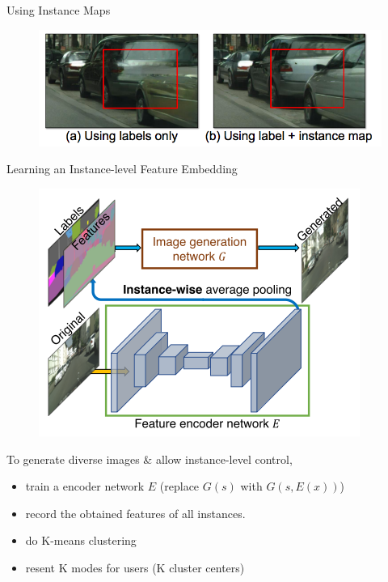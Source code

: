 \documentclass{beamer}
\begin{document}
\begin{frame}{Using Instance Maps}
\begin{figure}
	\centering
	\includegraphics[height=0.45\textheight]{images/instance_result}
\end{figure}
\end{frame}

\begin{frame}{Learning an Instance-level Feature Embedding}
\begin{figure}
	\centering
	\includegraphics[height=0.5\textheight]{images/instance}
\end{figure}
%
%
\begin{beamerboxesrounded}[upper=uppercol,lower=lowercol,shadow=false]{To generate diverse images \& allow instance-level control, }
\begin{itemize}
	\item
	train a encoder network $E$ (replace $G(s)$ with $G(s,E(x))$)
	\item
	record the obtained features of all instances.
	\item
	do K-means clustering 
	\item
	resent K modes for users (K cluster centers)
	
	\end{itemize}
\end{beamerboxesrounded}
\end{frame}
\end{document}
